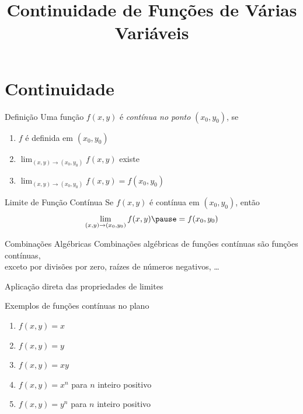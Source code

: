 \documentclass[fleqn,utf8,aspectratio=169,12pt]{beamer}
\title{Continuidade de Funções de Várias Variáveis}
\begin{document}
\addtitle

\section{Continuidade}

\begin{frame}{Definição}
  Uma função \(f(x, y)\) é \emph{contínua no ponto} $(x_0, y_0)$, se

  \vspace{0.5\baselineskip}
  \begin{enumerate}[<+->]
    \setlength\itemsep{1.5em}
    \item $f$ é definida em \((x_0, y_0)\)
    \item \(\lim_{(x, y)\to(x_0, y_0)} f(x, y)\) existe
    \item \(\lim_{(x, y)\to(x_0, y_0)} f(x, y) = f(x_0, y_0)\)
  \end{enumerate}

  \vspace{\baselineskip}
\end{frame}

\begin{frame}{Limite de Função Contínua}
  Se \(f(x, y)\) é contínua em $(x_0, y_0)$,
  \pause
  então
  \[
    \lim_{(x, y)\to(x_0, y_0)} f(x, y) \pause = f(x_0, y_0)
  \]
\end{frame}

\begin{frame}{Combinações Algébricas}
  Combinações algébricas de funções contínuas são funções contínuas, \\
  exceto por divisões por zero, raízes de números negativos, \dots

  \pause
  \vspace{\baselineskip}
  Aplicação direta das propriedades de limites
\end{frame}

\begin{question}
  Exemplos de funções contínuas no plano
  \begin{enumerate}[<+->]
    \item \(f(x, y) = x\)
    \item \(f(x, y) = y\)
    \item \(f(x, y) = xy\)
    \item \(f(x, y) = x^n\) para $n$ inteiro positivo
    \item \(f(x, y) = y^n\) para $n$ inteiro positivo
  \end{enumerate}
\end{question}
\end{document}
